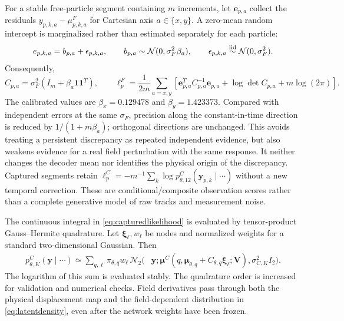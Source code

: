 \documentclass[11pt]{article}
\numberwithin{equation}{section}
\begin{document}
For a stable free-particle segment containing $m$ increments, let $\mathbf e_{p,a}$ collect the residuals $y_{p,k,a}-\mu^F_{p,k,a}$ for Cartesian axis $a\in\{x,y\}$. A zero-mean random intercept is marginalized rather than estimated separately for each particle:
\begin{equation}
 e_{p,k,a}=b_{p,a}+\epsilon_{p,k,a},\qquad
 b_{p,a}\sim\mathcal N(0,\sigma_F^2\beta_a),\qquad
 \epsilon_{p,k,a}\overset{\rm iid}{\sim}\mathcal N(0,\sigma_F^2).
 \label{eq:randombias}
\end{equation}
Consequently,
\begin{equation}
 C_{p,a}=\sigma_F^2(I_m+\beta_a\mathbf1\mathbf1^T),\qquad
 \ell_p^F=\frac{1}{2m}\sum_{a=x,y}
 \left[\mathbf e_{p,a}^TC_{p,a}^{-1}\mathbf e_{p,a}
       +\log\det C_{p,a}+m\log(2\pi)\right].
 \label{eq:correlatedfree}
\end{equation}
The calibrated values are $\beta_x=0.129478$ and $\beta_y=1.423373$. Compared with independent errors at the same $\sigma_F$, precision along the constant-in-time direction is reduced by $1/(1+m\beta_a)$; orthogonal directions are unchanged. This avoids treating a persistent discrepancy as repeated independent evidence, but also weakens evidence for a real field perturbation with the same response. It neither changes the decoder mean nor identifies the physical origin of the discrepancy. Captured segments retain $\ell_p^C=-m^{-1}\sum_k\log p_{\theta,12}^C(\mathbf y_{p,k}\mid\cdots)$ without a new temporal correction. These are conditional/composite observation scores rather than a complete generative model of raw tracks and measurement noise.

The continuous integral in \eqref{eq:capturedlikelihood} is evaluated by tensor-product Gauss--Hermite quadrature. Let $\bm\xi_\ell,w_\ell$ be nodes and normalized weights for a standard two-dimensional Gaussian. Then
\begin{equation}
 \begin{split}
 p_{\theta,K}^C(\mathbf y\mid\cdots)\simeq
 \sum_{q,\ell}\pi_{\theta,q}w_\ell\,
 \mathcal N_2\big(&\mathbf y;
 \bm\mu^C(q,\bm\mu_{\theta,q}+C_{\theta,q}\bm\xi_\ell;\mathbf V),
 \sigma_{C,K}^2I_2\big).
 \end{split}
 \label{eq:quadrature}
\end{equation}
The logarithm of this sum is evaluated stably. The quadrature order is increased for validation and numerical checks. Field derivatives pass through both the physical displacement map and the field-dependent distribution in \eqref{eq:latentdensity}, even after the network weights have been frozen.
\end{document}
